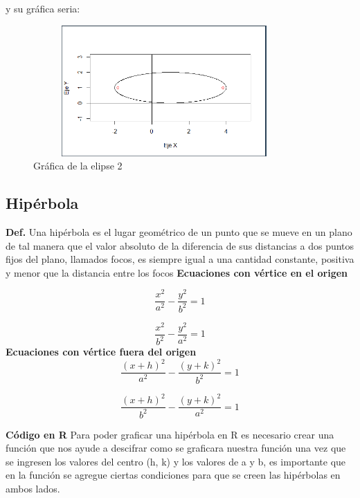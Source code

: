 \documentclass{article}
\begin{document}
\newpage

y su gráfica seria:
\begin{figure}[ht]
    \centering
    \includegraphics[width=10cm, height=5cm]{Grafica8}
    \caption{Gráfica de la elipse 2}
    \label{fig:mesh16}
\end{figure}


\subsection{Hipérbola}
\textbf{Def.} Una hipérbola es el lugar geométrico de un punto que se mueve en un plano de tal manera que el valor absoluto de la diferencia de sus distancias a dos puntos fijos del plano, llamados focos, es siempre igual a una cantidad constante, positiva y menor que la distancia entre los focos
\newline
\textbf{Ecuaciones con vértice en el origen}

\begin{equation}
    \frac{x^2}{a^2} - \frac{y^2}{b^2} = 1
\end{equation}

\begin{equation}
    \frac{x^2}{b^2} - \frac{y^2}{a^2} = 1
\end{equation}
\newline
\textbf{Ecuaciones con vértice fuera del origen}
\begin{equation}
    \frac{(x+h)^2}{a^2} - \frac{(y+k)^2}{b^2} = 1
\end{equation}

\begin{equation}
    \frac{(x+h)^2}{b^2} - \frac{(y+k)^2}{a^2} = 1
\end{equation}

\textbf{Código en R}
\newline Para poder graficar una hipérbola en R es necesario crear una función que nos ayude a descifrar como se graficara nuestra función una vez que se ingresen los valores del centro (h, k) y los valores de a y b, es importante que en la función se agregue ciertas condiciones para que se creen las hipérbolas en ambos lados.
\end{document}
